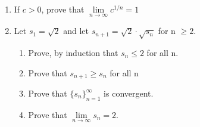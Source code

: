 \documentclass[11pt, letterpaper]{article}
\begin{document}
\begin{enumerate}
{	\setcounter{equation}{0}
	\begin{eqnarray}
		\we \nonumber \\
		\lim \limits_{n \to \infty} s_n \cdot t_n = \lim \limits_{n \to \infty} s_n \cdot \lim \limits_{n \to \infty} t_n \\
		\mathrm{we \space are \space given} \nonumber \\
		\lim \limits_{n \to \infty} \left( 1 + \frac{2}{n}\right)^n = \lim \limits_{n \to \infty} \left[\left( 1 + \frac{1}{n+1}\right)^n \left(1 + \frac{1}{n} \right)^n\right] \\
		\from \mathrm{(1) \space and \space (2)} \nonumber \\
		\lim \limits_{n \to \infty} \left(1 + \frac{2}{n} \right)^n = \lim \limits_{n \to \infty} \left( 1 + \frac{1}{n+1}\right)^n \lim \limits_{n \to \infty} \left( 1 + \frac{1}{n}\right)^n \\
		\we \nonumber \\
		\lim \limits_{n \to \infty} \left(1 + \frac{1}{n+1} \right)^n = e \spacem \mathrm{and} \\
		\lim \limits_{n \to \infty} \left(1 + \frac{1}{n} \right)^n = e \\
		\mathrm{Substituting\space (4)\space and \space (5) \space in \space (3)} \nonumber \\
		\lim \limits_{n \to \infty} \left(1 + \frac{2}{n} \right)^n = e \cdot e \nonumber \\
		\lim \limits_{n \to \infty} \left(1 + \frac{2}{n} \right)^n = e^2 \nonumber \\
		\hence \nonumber
	\end{eqnarray}
}

\item{If $c > 0$, prove that $\lim \limits_{n \to \infty} c^{1/n} = 1$}

\item{Let $s_1 = \sqrt{2}$ and let $s_{n+1} = \sqrt{2} \cdot \sqrt{s_n}$ for n $\geq 2$.
	\begin{enumerate}
		\item{Prove, by induction that $s_n \leq 2$ for all n.}
		\item{Prove that $s_{n+1} \geq s_n$ for all n}
		\item{Prove that $ \lbrace s_n \rbrace_{n=1}^\infty $ is convergent.}
		\item{Prove that $\lim \limits_{n \to \infty} s_n=2$.}
	\end{enumerate}
	
}
\end{enumerate}
\end{document}
